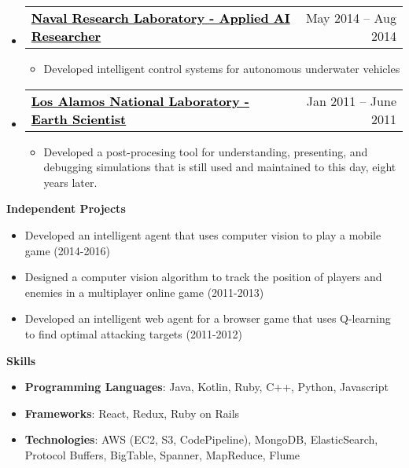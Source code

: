 \documentclass[letterpaper,12pt]{article}
\makeatletter
\newcommand{\link}[2]{\href{#1}{\textcolor{black}{#2}}}
\newcommand{\resitem}[1]{\item #1 \vspace{-2pt}}
\newcommand{\resheading}[1]{{\large \colorbox{mygrey}{\begin{minipage}{\textwidth}{\textbf{\sc #1 \vphantom{p\^{E}}}}\end{minipage}}}}
\newcommand{\miniheading}[2]{
	\begin{tabular*}{6.5in}{l@{\extracolsep{\fill}}r}
			\textbf{#1} & #2 \\
	\end{tabular*}\vspace{-6pt}
}
\makeatother
\begin{document}
\begin{itemize}
        \item \miniheading
            {\link{http://www.nrl.navy.mil/}{Naval Research Laboratory - Applied AI Researcher}}
            {May 2014 -- Aug 2014}
				\begin{itemize}
                    \resitem{Developed intelligent control systems for autonomous underwater vehicles}
               \end{itemize}
		\item \miniheading
            {\link{http://www.lanl.gov}{Los Alamos National Laboratory - Earth Scientist}}
            {Jan 2011 -- June 2011}
				\begin{itemize}
					\resitem{Developed a post-procesing tool for understanding, presenting, and debugging simulations that is still used and maintained to this day, eight years later.}
				\end{itemize}
	\end{itemize}
	
	
	\resheading{Independent Projects}
    \begin{itemize}
		\resitem{Developed an intelligent agent that uses computer vision to play a mobile game (2014-2016)}
		\resitem{Designed a computer vision algorithm to track the position of players and enemies in a multiplayer online game (2011-2013)}
		\resitem{Developed an intelligent web agent for a browser game that uses Q-learning to find optimal attacking targets (2011-2012)}
    \end{itemize}

\resheading{Skills}
	\begin{itemize}
		\resitem{\textbf{Programming Languages}: Java, Kotlin, Ruby, C++, Python, Javascript}
		\resitem{\textbf{Frameworks}: React, Redux, Ruby on Rails}
        \resitem{\textbf{Technologies}: AWS (EC2, S3, CodePipeline), MongoDB, ElasticSearch, Protocol Buffers, BigTable, Spanner, MapReduce, Flume}
	\end{itemize} %
\end{document}
